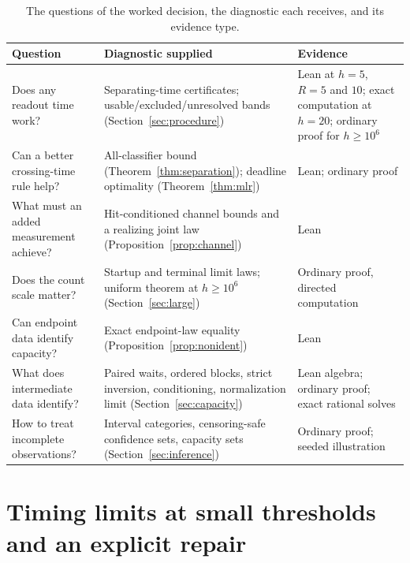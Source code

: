 \documentclass[11pt,a4paper]{article}
\theoremstyle{plain}
\theoremstyle{definition}
\theoremstyle{remark}
\begin{document}
\begin{table}[htbp]\centering\small
\begin{tabular}{>{\raggedright\arraybackslash}p{.28\linewidth}>{\raggedright\arraybackslash}p{.36\linewidth}>{\raggedright\arraybackslash}p{.28\linewidth}}\toprule
Question & Diagnostic supplied & Evidence\\\midrule
Does any readout time work? & Separating-time certificates; usable/excluded/unresolved bands (Section~\ref{sec:procedure}) & Lean at $h=5$, $R=5$ and $10$; exact computation at $h=20$; ordinary proof for $h\ge10^{6}$\\
Can a better crossing-time rule help? & All-classifier bound (Theorem~\ref{thm:separation}); deadline optimality (Theorem~\ref{thm:mlr}) & Lean; ordinary proof\\
What must an added measurement achieve? & Hit-conditioned channel bounds and a realizing joint law (Proposition~\ref{prop:channel}) & Lean\\
Does the count scale matter? & Startup and terminal limit laws; uniform theorem at $h\ge10^{6}$ (Section~\ref{sec:large}) & Ordinary proof, directed computation\\
Can endpoint data identify capacity? & Exact endpoint-law equality (Proposition~\ref{prop:nonident}) & Lean\\
What does intermediate data identify? & Paired waits, ordered blocks, strict inversion, conditioning, normalization limit (Section~\ref{sec:capacity}) & Lean algebra; ordinary proof; exact rational solves\\
How to treat incomplete observations? & Interval categories, censoring-safe confidence sets, capacity sets (Section~\ref{sec:inference}) & Ordinary proof; seeded illustration\\\bottomrule
\end{tabular}
\caption{The questions of the worked decision, the diagnostic each receives, and its evidence type.}\label{tab:map}
\end{table}

\section{Timing limits at small thresholds and an explicit repair}\label{sec:timing}
\end{document}
